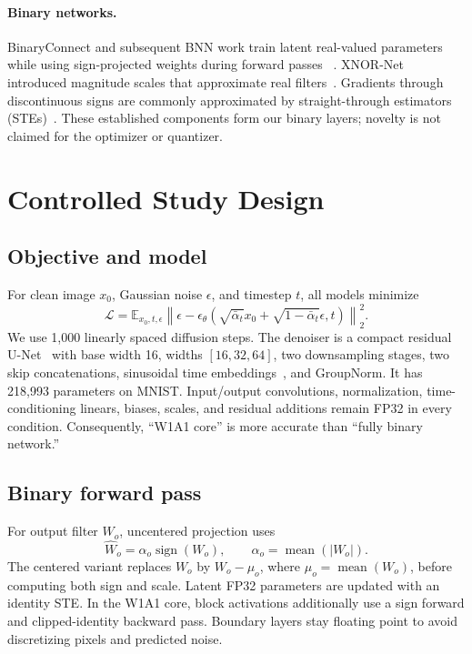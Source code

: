 \documentclass[conference]{IEEEtran}
\begin{document}
\paragraph{Binary networks.}
BinaryConnect and subsequent BNN work train latent real-valued parameters while
using sign-projected weights during forward passes
~\cite{courbariaux2015binaryconnect,hubara2016bnn}. XNOR-Net introduced magnitude
scales that approximate real filters~\cite{rastegari2016xnornet}. Gradients
through discontinuous signs are commonly approximated by straight-through
estimators (STEs)~\cite{bengio2013ste}. These established components form our
binary layers; novelty is not claimed for the optimizer or quantizer.

\section{Controlled Study Design}

\subsection{Objective and model}

For clean image $x_0$, Gaussian noise $\epsilon$, and timestep $t$, all models
minimize
\begin{equation}
\mathcal{L}=\mathbb{E}_{x_0,t,\epsilon}
\left\|\epsilon-\epsilon_\theta
\left(\sqrt{\bar\alpha_t}x_0+
\sqrt{1-\bar\alpha_t}\epsilon,t\right)\right\|_2^2.
\end{equation}
We use 1,000 linearly spaced diffusion steps. The denoiser is a compact residual
U-Net~\cite{ronneberger2015unet} with base width 16, widths $[16,32,64]$, two
downsampling stages, two skip concatenations, sinusoidal time
embeddings~\cite{vaswani2017attention}, and GroupNorm. It has 218,993
parameters on MNIST. Input/output convolutions, normalization, time-conditioning
linears, biases, scales, and residual additions remain FP32 in every condition.
Consequently, ``W1A1 core'' is more accurate than ``fully binary network.''

\subsection{Binary forward pass}

For output filter $W_o$, uncentered projection uses
\begin{equation}
\widehat W_o=\alpha_o\operatorname{sign}(W_o),\qquad
\alpha_o=\operatorname{mean}(|W_o|).
\end{equation}
The centered variant replaces $W_o$ by $W_o-\mu_o$, where
$\mu_o=\operatorname{mean}(W_o)$, before computing both sign and scale. Latent
FP32 parameters are updated with an identity STE. In the W1A1 core, block
activations additionally use a sign forward and clipped-identity backward pass.
Boundary layers stay floating point to avoid discretizing pixels and predicted
noise.
\end{document}
